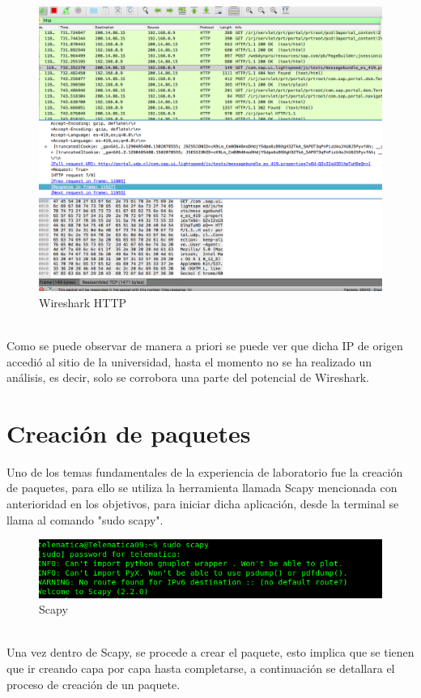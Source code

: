 \documentclass[spanish]{udpreport}
\begin{document}
\begin{figure}[h]
    \centering
    \includegraphics[scale=0.2]{images/wire2.png}
    \caption{Wireshark HTTP}
    \label{fig:my_label}
\end{figure}
\\Como se puede observar de manera a priori se puede ver que dicha IP de origen accedió al sitio de la universidad, hasta el momento no se ha realizado un análisis, es decir, solo se corrobora una parte del potencial de Wireshark.
\section{Creación de paquetes}
Uno de los temas fundamentales de la experiencia de laboratorio fue la creación de paquetes, para ello se utiliza la herramienta llamada Scapy mencionada con anterioridad en los objetivos, para iniciar dicha aplicación, desde la terminal se llama al comando "sudo scapy".
\begin{figure}[h]
    \centering
    \includegraphics[scale=0.3]{images/in.png}
    \caption{Scapy}
    \label{fig:my_label}
\end{figure}
\\Una vez dentro de Scapy, se procede a crear el paquete, esto implica que se tienen que ir creando capa por capa hasta completarse, a continuación se detallara el proceso de creación de un paquete.
\end{document}
